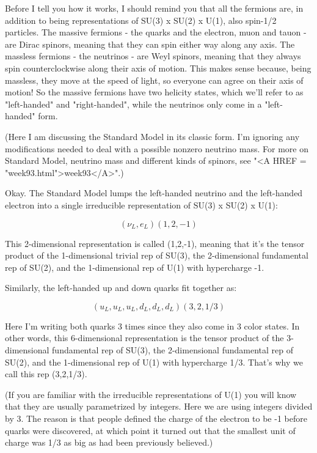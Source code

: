 Before I tell you how it works, I should remind you that all the
fermions are, in addition to being representations of SU(3) x SU(2) x
U(1), also spin-1/2 particles.  The massive fermions - the quarks and
the electron, muon and tauon - are Dirac spinors, meaning that they
can spin either way along any axis.  The massless fermions - the
neutrinos - are Weyl spinors, meaning that they always spin
counterclockwise along their axis of motion.  This makes sense
because, being massless, they move at the speed of light, so everyone
can agree on their axis of motion!  So the massive fermions have two
helicity states, which we'll refer to as "left-handed" and
"right-handed", while the neutrinos only come in a "left-handed" form.

(Here I am discussing the Standard Model in its classic form.  I'm
ignoring any modifications needed to deal with a possible nonzero
neutrino mass.  For more on Standard Model, neutrino mass and
different kinds of spinors, see "<A HREF = "week93.html">week93</A>".)

Okay.  The Standard Model lumps the left-handed neutrino and the
left-handed electron into a single irreducible representation of 
SU(3) x SU(2) x U(1):


$$

(\nu _{L}, e_{L})                                 (1,2,-1)
$$
    
This 2-dimensional representation is called (1,2,-1), meaning
that it's the tensor product of the 1-dimensional trivial rep
of SU(3), the 2-dimensional fundamental rep of SU(2), and the
1-dimensional rep of U(1) with hypercharge -1.  

Similarly, the left-handed up and down quarks fit together as:


$$

(u_{L}, u_{L}, u_{L}, d_{L}, d_{L}, d_{L})              (3,2,1/3)
$$
    
Here I'm writing both quarks 3 times since they also come in 3 color
states.  In other words, this 6-dimensional representation is the
tensor product of the 3-dimensional fundamental rep of SU(3), the
2-dimensional fundamental rep of SU(2), and the 1-dimensional rep of
U(1) with hypercharge 1/3.  That's why we call this rep (3,2,1/3).  

(If you are familiar with the irreducible representations of U(1) you
will know that they are usually parametrized by integers.  Here we are
using integers divided by 3.  The reason is that people defined the
charge of the electron to be -1 before quarks were discovered, at
which point it turned out that the smallest unit of charge was 1/3 as
big as had been previously believed.)

